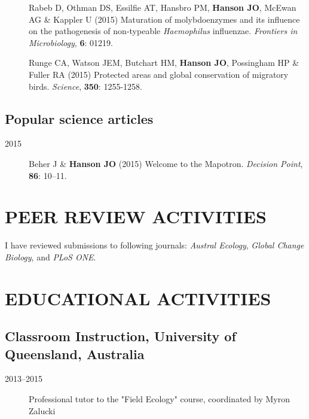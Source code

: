 \documentclass[12pt,a4paper]{article}
\begin{document}
\begin{description}
\item[] Rabeb D, Othman DS, Essilfie AT, Hansbro PM, \textbf{Hanson JO}, McEwan AG \& Kappler U (2015) Maturation of molybdoenzymes and its influence on the pathogenesis of non-typeable \textit{Haemophilus} influenzae. \textit{Frontiers in Microbiology}, \textbf{6}: 01219.

\item[] Runge CA, Watson JEM, Butchart HM, \textbf{Hanson JO}, Possingham HP \& Fuller RA (2015) Protected areas and global conservation of migratory birds. \textit{Science}, \textbf{350}: 1255-1258.

\end{description}

\subsection*{Popular science articles}
\begin{description}

\item[2015] Beher J \& \textbf{Hanson JO} (2015) Welcome to the Mapotron. \textit{Decision Point}, \textbf{86}: 10--11.

\end{description}

\section*{PEER REVIEW ACTIVITIES}

I have reviewed submissions to following journals: \textit{Austral Ecology},   \textit{Global Change Biology}, and \textit{PLoS ONE}.

\section*{EDUCATIONAL ACTIVITIES}

\subsection*{Classroom Instruction, University of Queensland, Australia}
\begin{description}

\item[2013--2015] Professional tutor to the "Field Ecology" course, coordinated by Myron Zalucki

\end{description}
\end{document}
